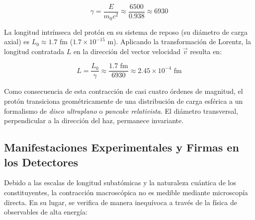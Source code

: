 \documentclass[11pt,a4paper]{book}
\begin{document}
\begin{equation}
\gamma = \frac{E}{m_0 c^2} \approx \frac{6500}{0.938} \approx 6930
\end{equation}

La longitud intrínseca del protón en su sistema de reposo (su diámetro de carga axial) es $L_0 \approx 1.7\text{ fm}$ ($1.7 \times 10^{-15}\text{ m}$). Aplicando la transformación de Lorentz, la longitud contratada $L$ en la dirección del vector velocidad $\vec{v}$ resulta en:

\begin{equation}
L = \frac{L_0}{\gamma} \approx \frac{1.7\text{ fm}}{6930} \approx 2.45 \times 10^{-4}\text{ fm}
\end{equation}

Como consecuencia de esta contracción de casi cuatro órdenes de magnitud, el protón transiciona geométricamente de una distribución de carga esférica a un formalismo de \textit{disco ultraplano} o \textit{pancake relativista}. El diámetro transversal, perpendicular a la dirección del haz, permanece invariante.

\subsection{Manifestaciones Experimentales y Firmas en los Detectores}
Debido a las escalas de longitud subatómicas y la naturaleza cuántica de los constituyentes, la contracción macroscópica no es medible mediante microscopía directa. En su lugar, se verifica de manera inequívoca a través de la física de observables de alta energía:
\end{document}
